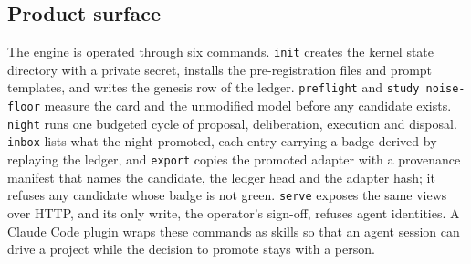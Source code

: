 \subsection{Product surface}
The engine is operated through six commands. \texttt{init} creates the kernel state directory with a private secret, installs the pre-registration files and prompt templates, and writes the genesis row of the ledger. \texttt{preflight} and \texttt{study noise-floor} measure the card and the unmodified model before any candidate exists. \texttt{night} runs one budgeted cycle of proposal, deliberation, execution and disposal. \texttt{inbox} lists what the night promoted, each entry carrying a badge derived by replaying the ledger, and \texttt{export} copies the promoted adapter with a provenance manifest that names the candidate, the ledger head and the adapter hash; it refuses any candidate whose badge is not green. \texttt{serve} exposes the same views over HTTP, and its only write, the operator's sign-off, refuses agent identities. A Claude Code plugin wraps these commands as skills so that an agent session can drive a project while the decision to promote stays with a person.

